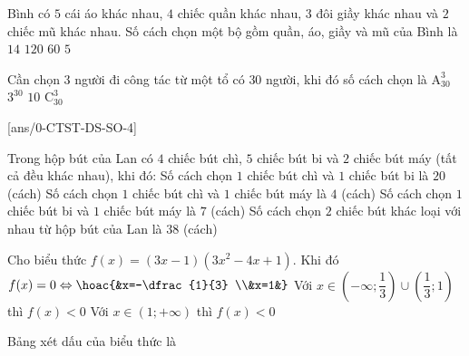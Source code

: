 \begin{ex}%
	Bình có $5$ cái áo khác nhau, $4$ chiếc quần khác nhau, $3$ đôi giầy khác nhau và $2$ chiếc mũ khác nhau. Số cách chọn một bộ gồm quần, áo, giầy và mũ của Bình là
	\choice
	{$14$}
	{\True $120$}
	{$60$}
	{$5$}
	\loigiai{
		
	}
\end{ex}

\begin{ex}%
	Cần chọn $3$ người đi công tác từ một tổ có $30$ người, khi đó số cách chọn là
	\choice
	{$\mathrm{A}_{30}^3$}
	{$3^{30}$}
	{$10$}
	{\True $\mathrm{C}_{30}^3$}
	\loigiai{
	
	}
\end{ex}

\cauds
{}[ans/0-CTST-DS-SO-4]
\setcounter{ex}{0}

\begin{ex}%
	Trong hộp bút của Lan có $4$ chiếc bút chì, $5$ chiếc bút bi và $2$ chiếc bút máy (tất cả đều khác nhau), khi đó:
	\choiceTF
	{\True Số cách chọn $1$ chiếc bút chì và $1$ chiếc bút bi là $20$ (cách)}
	{Số cách chọn $1$ chiếc bút chì và $1$ chiếc bút máy là $4$ (cách)}
	{Số cách chọn $1$ chiếc bút bi và $1$ chiếc bút máy là $7$ (cách)}
	{\True Số cách chọn $2$ chiếc bút khác loại với nhau từ hộp bút của Lan là $38$ (cách)}
	\loigiai{
	
	}
\end{ex}

\begin{ex}%
	Cho biểu thức $f(x)=(3x-1)\left(3x^2-4x+1\right)$. Khi đó
	\choiceTF
	{\True $f(x)=0\Leftrightarrow\hoac{&x=-\dfrac{1}{3} \\&x=1&}$}
	{\True Với $x \in\left(-\infty; \dfrac{1}{3}\right) \cup\left(\dfrac{1}{3}; 1\right)$ thì $f(x) < 0$}
	{Với $x \in(1;+\infty)$ thì $f(x) < 0$}
	{\True Bảng xét dấu của biểu thức là \\
		}
	\loigiai{
	
	}
\end{ex}

